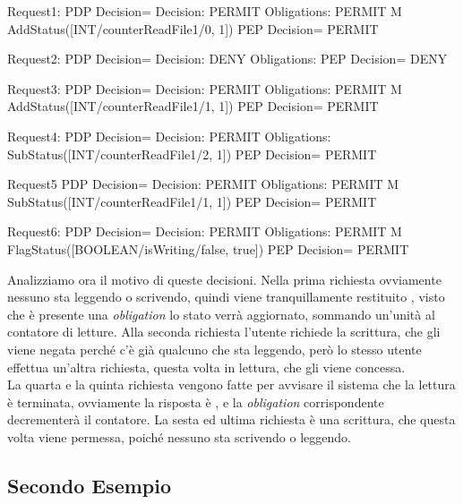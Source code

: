 \begin{verbnobox}[\small]
 Request1:
	  PDP Decision=
 	  Decision: PERMIT Obligations: PERMIT M AddStatus([INT/counterReadFile1/0, 1])
	  PEP Decision= PERMIT
 	
 Request2:
	  PDP Decision=
 	  Decision: DENY Obligations: 
	  PEP Decision= DENY
 	
 Request3:
	  PDP Decision=
 	  Decision: PERMIT Obligations: PERMIT M AddStatus([INT/counterReadFile1/1, 1])
	  PEP Decision= PERMIT
 	
 Request4:
	  PDP Decision=
 	  Decision: PERMIT Obligations: SubStatus([INT/counterReadFile1/2, 1])
	  PEP Decision= PERMIT
 	
 Request5
	  PDP Decision=
 	  Decision: PERMIT Obligations: PERMIT M SubStatus([INT/counterReadFile1/1, 1])
	  PEP Decision= PERMIT
 	
 Request6:
	  PDP Decision=
 	  Decision: PERMIT Obligations: PERMIT M FlagStatus([BOOLEAN/isWriting/false, true])
	  PEP Decision= PERMIT
 \end{verbnobox}
Analizziamo ora il motivo di queste decisioni. Nella prima richiesta ovviamente nessuno sta leggendo o scrivendo, quindi viene tranquillamente restituito \permit, visto che è presente una \textit{obligation} lo stato verrà aggiornato, sommando un'unità al contatore di letture.
Alla seconda richiesta l'utente richiede la scrittura, che gli viene negata perché c'è già qualcuno che sta leggendo, però lo stesso utente effettua un'altra richiesta, questa volta in lettura, che gli viene concessa.\\
La quarta e la quinta richiesta vengono fatte per avvisare il sistema che la lettura è terminata, ovviamente la risposta è \permit, e la \textit{obligation} corrispondente decrementerà il contatore.
La sesta ed ultima richiesta è una scrittura, che questa volta viene permessa, poiché nessuno sta scrivendo o leggendo.



\subsection{Secondo Esempio} %
\label{sub:secondo_esempio}



